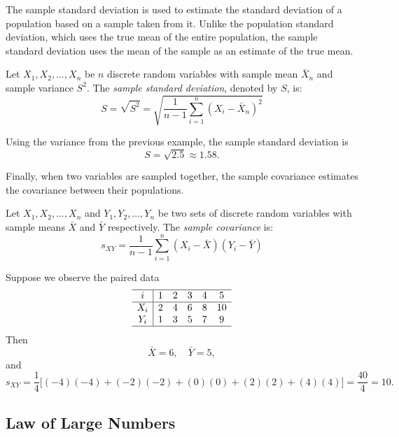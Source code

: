 The sample standard deviation is used to estimate the standard deviation of a population based on a sample taken from it. Unlike the population standard deviation, which uses the true mean of the entire population, the sample standard deviation uses the mean of the sample as an estimate of the true mean.

\begin{definition}
Let \( X_1, X_2, \ldots, X_n \) be \( n \) discrete random variables with sample mean \( \bar{X}_n \) and sample variance \( S^2 \). The \emph{sample standard deviation}, denoted by \( S \), is:
\[
S = \sqrt{S^2} = \sqrt{ \frac{1}{n - 1} \sum_{i=1}^{n} \left( X_i - \bar{X}_n \right)^2 }
\]
\end{definition}

\begin{example}
Using the variance from the previous example, the sample standard deviation is
\[
S = \sqrt{2.5} \approx 1.58.
\]
\end{example}

Finally, when two variables are sampled together, the sample covariance estimates the covariance between their populations.

\begin{definition}
Let \( X_1, X_2, \ldots, X_n \) and \( Y_1, Y_2, \ldots, Y_n \) be two sets of discrete random variables with sample means \( \bar{X} \) and \( \bar{Y} \) respectively. The \emph{sample covariance} is:
\[
s_{XY} = \frac{1}{n - 1} \sum_{i=1}^n ( X_i - \bar{X} ) ( Y_i - \bar{Y} )
\]
\end{definition}

\begin{example}
Suppose we observe the paired data
\[
\begin{array}{c|ccccc}
\hline
i & 1 & 2 & 3 & 4 & 5 \\
\hline
X_i & 2 & 4 & 6 & 8 & 10 \\
Y_i & 1 & 3 & 5 & 7 & 9 \\
\hline
\end{array}
\]
Then
\[
\bar{X} = 6, \quad \bar{Y} = 5,
\]
and
\[
s_{XY} = \frac{1}{4}\big[(-4)(-4) + (-2)(-2) + (0)(0) + (2)(2) + (4)(4)\big] = \frac{40}{4} = 10.
\]
\end{example}


\subsection{Law of Large Numbers}

